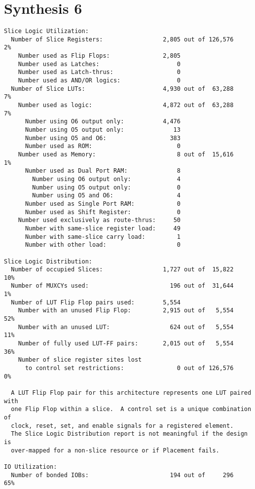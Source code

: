 \section{Synthesis 6}
\begin{verbatim}
Slice Logic Utilization:
  Number of Slice Registers:                 2,805 out of 126,576    2%
    Number used as Flip Flops:               2,805
    Number used as Latches:                      0
    Number used as Latch-thrus:                  0
    Number used as AND/OR logics:                0
  Number of Slice LUTs:                      4,930 out of  63,288    7%
    Number used as logic:                    4,872 out of  63,288    7%
      Number using O6 output only:           4,476
      Number using O5 output only:              13
      Number using O5 and O6:                  383
      Number used as ROM:                        0
    Number used as Memory:                       8 out of  15,616    1%
      Number used as Dual Port RAM:              8
        Number using O6 output only:             4
        Number using O5 output only:             0
        Number using O5 and O6:                  4
      Number used as Single Port RAM:            0
      Number used as Shift Register:             0
    Number used exclusively as route-thrus:     50
      Number with same-slice register load:     49
      Number with same-slice carry load:         1
      Number with other load:                    0

Slice Logic Distribution:
  Number of occupied Slices:                 1,727 out of  15,822   10%
  Number of MUXCYs used:                       196 out of  31,644    1%
  Number of LUT Flip Flop pairs used:        5,554
    Number with an unused Flip Flop:         2,915 out of   5,554   52%
    Number with an unused LUT:                 624 out of   5,554   11%
    Number of fully used LUT-FF pairs:       2,015 out of   5,554   36%
    Number of slice register sites lost
      to control set restrictions:               0 out of 126,576    0%

  A LUT Flip Flop pair for this architecture represents one LUT paired with
  one Flip Flop within a slice.  A control set is a unique combination of
  clock, reset, set, and enable signals for a registered element.
  The Slice Logic Distribution report is not meaningful if the design is
  over-mapped for a non-slice resource or if Placement fails.

IO Utilization:
  Number of bonded IOBs:                       194 out of     296   65%


\end{verbatim}
